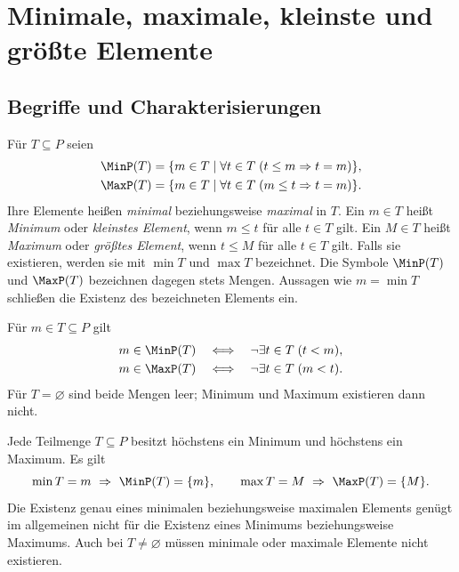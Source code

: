 \chapter{Minimale, maximale, kleinste und größte Elemente}
\label{b12guide:ch:extremal}

\section{Begriffe und Charakterisierungen}

\begin{definition}
\label{b12guide:def:extremal}
Für $T\subseteq P$ seien
\[
\begin{aligned}
 \MinP(T)&=\{m\in T\mid\forall t\in T\;(t\leq m\Rightarrow t=m)\},\\
 \MaxP(T)&=\{m\in T\mid\forall t\in T\;(m\leq t\Rightarrow t=m)\}.
\end{aligned}
\]
Ihre Elemente heißen \emph{minimal} beziehungsweise \emph{maximal}
in $T$. Ein $m\in T$ heißt \emph{Minimum} oder \emph{kleinstes
Element}, wenn $m\leq t$ für alle $t\in T$ gilt.
Ein $M\in T$ heißt \emph{Maximum} oder \emph{größtes Element},
wenn $t\leq M$ für alle $t\in T$ gilt.
Falls sie existieren, werden sie mit $\min T$ und $\max T$ bezeichnet.
Die Symbole $\MinP(T)$ und $\MaxP(T)$ bezeichnen dagegen stets Mengen.
Aussagen wie $m=\min T$ schließen die Existenz des bezeichneten
Elements ein.
\end{definition}

\begin{theorem}
Für $m\in T\subseteq P$ gilt
\[
\begin{aligned}
 m\in\MinP(T)&\quad\Longleftrightarrow\quad
                    \neg\exists t\in T\;(t<m),\\
 m\in\MaxP(T)&\quad\Longleftrightarrow\quad
                    \neg\exists t\in T\;(m<t).
\end{aligned}
\]
Für $T=\varnothing$ sind beide Mengen leer; Minimum und Maximum
existieren dann nicht.
\end{theorem}

\begin{theorem}
\label{b12guide:thm:least}
Jede Teilmenge $T\subseteq P$ besitzt höchstens ein Minimum und
höchstens ein Maximum. Es gilt
\[
 \min T=m\ \Rightarrow\ \MinP(T)=\{m\},\qquad
 \max T=M\ \Rightarrow\ \MaxP(T)=\{M\}.
\]
Die Existenz genau eines minimalen beziehungsweise maximalen
Elements genügt im allgemeinen nicht für die Existenz eines
Minimums beziehungsweise Maximums. Auch bei $T\ne\varnothing$
müssen minimale oder maximale Elemente nicht existieren.
\end{theorem}

